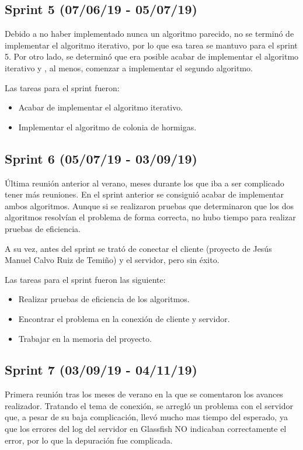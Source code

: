 \subsection{Sprint 5 (07/06/19 - 05/07/19)}
Debido a no haber implementado nunca un algoritmo parecido, no se terminó de implementar el algoritmo iterativo, por lo que esa tarea se mantuvo para el sprint 5.
Por otro lado, se determinó que era posible acabar de implementar el algoritmo iterativo y , al menos, comenzar a implementar el segundo algoritmo.

Las tareas para el sprint fueron:
\begin{itemize}
\item Acabar de implementar el algoritmo iterativo.
\item Implementar el algoritmo de colonia de hormigas.
\end{itemize}
\subsection{Sprint 6 (05/07/19 - 03/09/19)}
Última reunión anterior al verano, meses durante los que iba a ser complicado tener más reuniones.
En el sprint anterior se consiguió acabar de implementar ambos algoritmos. Aunque si se realizaron pruebas que determinaron que los dos algoritmos resolvían el problema de forma correcta, no hubo tiempo para realizar pruebas de eficiencia.

A su vez, antes del sprint se trató de conectar el cliente (proyecto de Jesús Manuel Calvo Ruiz de Temiño) y el servidor, pero sin éxito.

Las tareas para el sprint fueron las siguiente:
\begin{itemize}
\item Realizar pruebas de eficiencia de los algoritmos.
\item Encontrar el problema en la conexión de cliente y servidor.
\item Trabajar en la memoria del proyecto.
\end{itemize}
\subsection{Sprint 7 (03/09/19 - 04/11/19)}
Primera reunión tras los meses de verano en la que se comentaron los avances realizador.
Tratando el tema de conexión, se arregló un problema con el servidor que, a pesar de su baja complicación, llevó mucho mas tiempo del esperado, ya que los errores del log del servidor en Glassfish NO indicaban correctamente el error, por lo que la depuración fue complicada.

